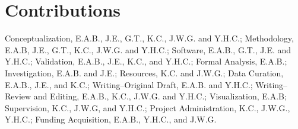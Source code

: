 \documentclass[preprint,review,3p,12pt]{elsarticle}
\begin{document}
\section{Contributions}
Conceptualization, E.A.B., J.E., G.T., K.C., J.W.G. and Y.H.C.; Methodology, E.A.B, J.E., G.T., K.C., J.W.G. and Y.H.C.; Software, E.A.B., G.T., J.E. and Y.H.C.; Validation, E.A.B., J.E., K.C., and Y.H.C.; Formal Analysis, E.A.B.; Investigation, E.A.B. and J.E.; Resources, K.C. and J.W.G.; Data Curation, E.A.B., J.E., and K.C.; Writing–Original Draft, E.A.B. and Y.H.C.; Writing–Review and Editing, E.A.B., K.C., J.W.G. and Y.H.C.; Visualization, E.A.B; Supervision, K.C., J.W.G, and Y.H.C.; Project Administration, K.C., J.W.G., Y.H.C.; Funding Acquisition, E.A.B., Y.H.C., and J.W.G.





% 



\end{document}
